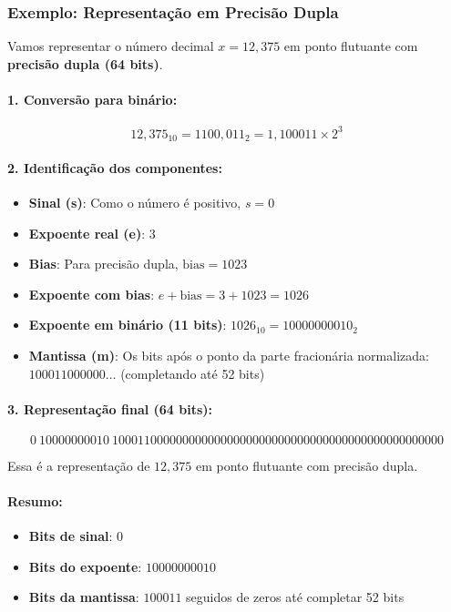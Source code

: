\subsubsection*{Exemplo: Representação em Precisão Dupla}

Vamos representar o número decimal \( x = 12{,}375 \) em ponto flutuante com
\textbf{precisão dupla (64 bits)}.

\paragraph{1. Conversão para binário:}

\[
  12{,}375_{10} = 1100{,}011_2 = 1{,}100011 \times 2^3
\]

\paragraph{2. Identificação dos componentes:}

\begin{itemize}
  \item \textbf{Sinal (s)}: Como o número é positivo, \( s = 0 \)
  \item \textbf{Expoente real (e)}: \( 3 \)
  \item \textbf{Bias}: Para precisão dupla, \( \text{bias} = 1023 \)
  \item \textbf{Expoente com bias}: \( e + \text{bias} = 3 + 1023 = 1026 \)
  \item \textbf{Expoente em binário (11 bits)}: \( 1026_{10} = 10000000010_2 \)
  \item \textbf{Mantissa (m)}: Os bits após o ponto da parte fracionária normalizada: \( 100011000000\ldots \) (completando até 52 bits)
\end{itemize}

\paragraph{3. Representação final (64 bits):}

\[
  \boxed{
    0\ 10000000010\ 1000110000000000000000000000000000000000000000000000
  }
\]

\noindent Essa é a representação de \( 12{,}375 \) em ponto flutuante com precisão dupla.

\paragraph{Resumo:}
\begin{itemize}
  \item \textbf{Bits de sinal}: \( 0 \)
  \item \textbf{Bits do expoente}: \( 10000000010 \)
  \item \textbf{Bits da mantissa}: \( 100011 \) seguidos de zeros até completar 52 bits
\end{itemize}

